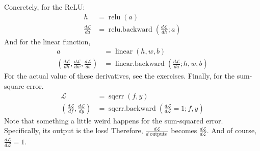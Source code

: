 \documentclass{article}
\newcommand{\dt}[2][]{\frac{d #1}{d #2}}
\newcommand{\dL}{\dt[\L]}
\newcommand{\bracket}[3]{\left#1 #3 \right#2}
\renewcommand{\b}{\bracket{(}{)}}
\renewcommand{\L}{\mathcal{L}}
\newcommand{\linear}{\operatorname{linear}}
\newcommand{\relu}{\operatorname{relu}}
\newcommand{\sqerr}{\operatorname{sqerr}}
\newcommand{\outputs}{\operatorname{outputs}}
\newcommand{\linearback}{\operatorname{linear{.}backward}}
\newcommand{\reluback}{\operatorname{relu{.}backward}}
\newcommand{\sqerrback}{\operatorname{sqerr{.}backward}}
\begin{document}
Concretely, for the ReLU:
\begin{subequations}
\begin{align}
  h &= \relu\b{a} \\ 
  \dL{a} &= \reluback\b{\dL{h}; a}
\end{align}
\end{subequations}
And for the linear function,
\begin{subequations}
\begin{align}
  a &= \linear\b{h, w, b} \\ 
  \b{\dL{h}, \dL{w}, \dL{b}} &= \linearback\b{\dL{a}; h, w, b}
\end{align}
\end{subequations}
For the actual value of these derivatives, see the exercises.
Finally, for the sum-square error.
\begin{subequations}
\begin{align}
  \L &= \sqerr\b{f, y} \\ 
  \b{\dL{f}, \dL{y}} &= \sqerrback\b{\dL{\L}=1; f, y}
\end{align}
\end{subequations}
Note that something a little weird happens for the sum-squared error.
Specifically, its output is the loss!
Therefore, $\dL{\outputs}$ becomes $\dL{\L}$.  And of course, $\dL{\L}=1$.
\end{document}
